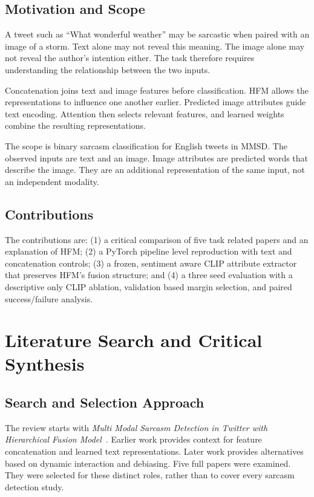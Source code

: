 \documentclass[conference]{IEEEtran}
\begin{document}
\subsection{Motivation and Scope}
A tweet such as ``What wonderful weather'' may be sarcastic when paired with an image of a storm. Text alone may not reveal this meaning. The image alone may not reveal the author's intention either. The task therefore requires understanding the relationship between the two inputs.

Concatenation joins text and image features before classification. HFM allows the representations to influence one another earlier. Predicted image attributes guide text encoding. Attention then selects relevant features, and learned weights combine the resulting representations.

The scope is binary sarcasm classification for English tweets in MMSD. The observed inputs are text and an image. Image attributes are predicted words that describe the image. They are an additional representation of the same input, not an independent modality.

\subsection{Contributions}
The contributions are: (1) a critical comparison of five task related papers and an explanation of HFM; (2) a PyTorch pipeline level reproduction with text and concatenation controls; (3) a frozen, sentiment aware CLIP attribute extractor that preserves HFM's fusion structure; and (4) a three seed evaluation with a descriptive only CLIP ablation, validation based margin selection, and paired success/failure analysis.

\section{Literature Search and Critical Synthesis}
\subsection{Search and Selection Approach}
The review starts with \emph{Multi Modal Sarcasm Detection in Twitter with Hierarchical Fusion Model}~\cite{cai2019}. Earlier work provides context for feature concatenation and learned text representations. Later work provides alternatives based on dynamic interaction and debiasing. Five full papers were examined. They were selected for these distinct roles, rather than to cover every sarcasm detection study. 
\end{document}
